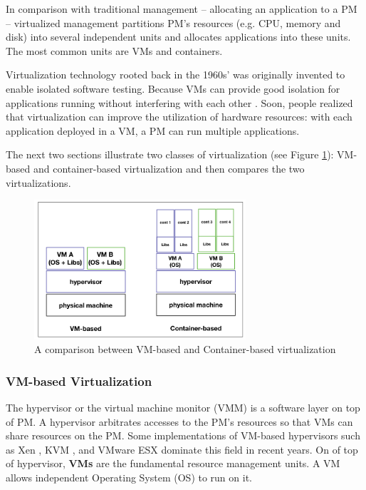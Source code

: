  In comparison with traditional management -- allocating an application to a PM -- virtualized management partitions PM's resources (e.g. CPU, memory and disk) into several independent units and allocates applications into these units. 
The most common units are VMs and containers.

Virtualization technology rooted back in the 1960s' was originally invented to enable isolated software testing. Because VMs can provide good isolation for applications running without interfering with each other \cite{Somani:2009ho}. Soon, people realized that virtualization can improve the utilization of hardware resources: with each application deployed in a VM, a PM can run multiple applications. 

The next two sections illustrate two classes of virtualization (see Figure \ref{fig:comparison}): VM-based and container-based virtualization and then compares the two virtualizations.

\begin{figure}
	\centering
	\includegraphics[width=0.7\textwidth]{pics/comparison.png}
	\caption{A comparison between VM-based and Container-based virtualization \cite{Piraghaj:2016bw}}
	\label{fig:comparison}
\end{figure}

\subsubsection{VM-based Virtualization} 

The hypervisor or the virtual machine monitor (VMM) is a software layer on top of PM. A hypervisor arbitrates accesses to the PM's resources so that VMs can share resources on the PM. Some implementations of VM-based hypervisors such as Xen \cite{Barham:2003cj}, KVM \cite{Kivity:2007wu}, and VMware ESX \cite{Waldspurger:2002db} dominate this field in recent years. On of top of hypervisor, \textbf{VMs} are the fundamental resource management units. A VM allows independent Operating System (OS) to run on it.  

